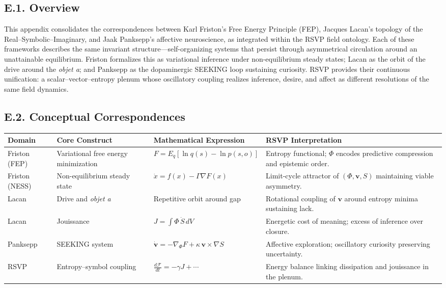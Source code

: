 \documentclass[12pt,a4paper]{article}
\begin{document}
\subsection*{E.1. Overview}

This appendix consolidates the correspondences between Karl Friston’s Free Energy Principle (FEP), Jacques Lacan’s topology of the Real–Symbolic–Imaginary, and Jaak Panksepp’s affective neuroscience, as integrated within the RSVP field ontology.
Each of these frameworks describes the same invariant structure—self-organizing systems that persist through asymmetrical circulation around an unattainable equilibrium.
Friston formalizes this as variational inference under non-equilibrium steady states; Lacan as the orbit of the drive around the \emph{objet a}; and Panksepp as the dopaminergic \textsc{SEEKING} loop sustaining curiosity.
RSVP provides their continuous unification: a scalar–vector–entropy plenum whose oscillatory coupling realizes inference, desire, and affect as different resolutions of the same field dynamics.

\subsection*{E.2. Conceptual Correspondences}

\begin{center}
\renewcommand{\arraystretch}{1.4}
\begin{tabular}{@{}p{3cm}p{4.2cm}p{3.8cm}p{4.2cm}@{}}
\toprule
\textbf{Domain} & \textbf{Core Construct} & \textbf{Mathematical Expression} & \textbf{RSVP Interpretation} \\
\midrule
Friston (FEP) &
Variational free energy minimization &
$F = E_q[\ln q(s)-\ln p(s,o)]$ &
Entropy functional; $\Phi$ encodes predictive compression and epistemic order. \\
\addlinespace
Friston (NESS) &
Non-equilibrium steady state &
$\dot{x} = f(x) - \Gamma \nabla F(x)$ &
Limit-cycle attractor of $(\Phi,\mathbf{v},S)$ maintaining viable asymmetry. \\
\addlinespace
Lacan &
Drive and \emph{objet a} &
Repetitive orbit around gap &
Rotational coupling of $\mathbf{v}$ around entropy minima sustaining lack. \\
\addlinespace
Lacan &
Jouissance &
$J = \!\int\!\Phi\,\dot S\,dV$ &
Energetic cost of meaning; excess of inference over closure. \\
\addlinespace
Panksepp &
\textsc{SEEKING} system &
$\dot{\mathbf{v}} = -\nabla_{\Phi}F + \kappa\,\mathbf{v}\!\times\!\nabla S$ &
Affective exploration; oscillatory curiosity preserving uncertainty. \\
\addlinespace
RSVP &
Entropy–symbol coupling &
$\tfrac{d\mathcal{F}}{dt} = -\gamma J + \cdots$ &
Energy balance linking dissipation and jouissance in the plenum. \\
\bottomrule
\end{tabular}
\end{center}
\end{document}
